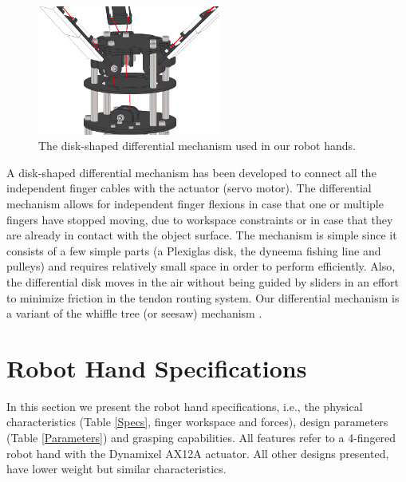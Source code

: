 \begin{figure}
 	\vspace{0pt}
 	\begin{center}
\includegraphics[width=6cm]{figures/Intro/Fig1-4.png}
 	\end{center}
 	\vspace{0pt}
 	\caption{The disk-shaped differential mechanism used in our robot hands.}
	\label{Disk}
 	\vspace{0pt}
\end{figure}

A disk-shaped differential mechanism has been developed to connect all the independent finger cables with the actuator (servo motor). The differential mechanism allows for independent finger flexions in case that one or multiple fingers have stopped moving, due to workspace constraints or in case that they are already in contact with the object surface. The mechanism is simple since it consists of a few simple parts (a Plexiglas disk, the dyneema fishing line and pulleys) and requires relatively small space in order to perform efficiently. Also, the differential disk moves in the air without being guided by sliders in an effort to minimize friction in the tendon routing system. Our differential mechanism is a variant of the whiffle tree (or seesaw) mechanism \cite{BirglenIJRR2006}.

\newpage

\section{Robot Hand Specifications}

In this section we present the robot hand specifications, i.e., the physical characteristics (Table \ref{Specs}, finger workspace and forces), design parameters 
(Table \ref{Parameters}) and grasping capabilities. All features refer to a 4-fingered robot hand with the Dynamixel AX12A actuator. All other designs presented, have lower weight but similar characteristics. \\

